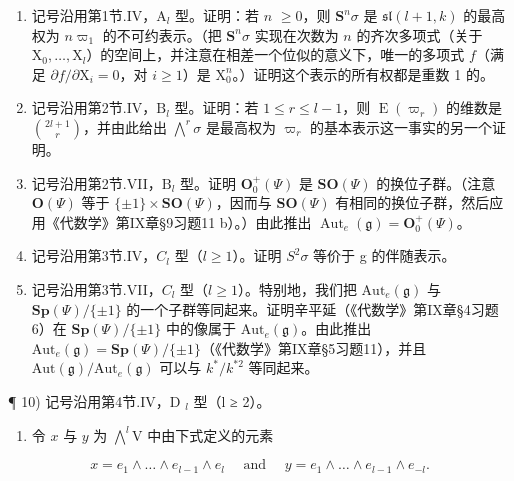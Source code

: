 \begin{enumerate}
\def\labelenumi{\arabic{enumi})}
\setcounter{enumi}{4}
\item
  记号沿用第1节.IV，\(\mathrm{A}_l\) 型。证明：若 \(n\) \(\geq 0\)，则 \(\mathbf{S}^n\sigma\) 是 \(\mathfrak{sl}(l + 1,k)\) 的最高权为 \(n\varpi_1\) 的不可约表示。（把 \(\mathbf{S}^n\sigma\) 实现在次数为 \(n\) 的齐次多项式（关于 \(\mathrm{X}_0,\dots ,\mathrm{X}_l\)）的空间上，并注意在相差一个位似的意义下，唯一的多项式 \(f\)（满足 \(\partial f / \partial \mathrm{X}_i = 0\)，对 \(i\geq 1\)）是 \(\mathrm{X}_0^n\)。）证明这个表示的所有权都是重数 1 的。
\item
  记号沿用第2节.IV，\(\mathrm{B}_l\) 型。证明：若 \(1 \leq r \leq l - 1\)，则 \(\operatorname{E}(\varpi_r)\) 的维数是 \(\binom{2l + 1}{r}\)，并由此给出 \(\bigwedge^r \sigma\) 是最高权为 \(\varpi_r\) 的基本表示这一事实的另一个证明。
\item
  记号沿用第2节.VII，\(\mathrm{B}_l\) 型。证明 \(\mathbf{O}_0^+ (\Psi)\) 是 \(\mathbf{SO}(\Psi)\) 的换位子群。（注意 \(\mathbf{O}(\Psi)\) 等于 \(\{\pm 1\} \times \mathbf{SO}(\Psi)\)，因而与 \(\mathbf{SO}(\Psi)\) 有相同的换位子群，然后应用《代数学》第IX章§9习题11 b）。）由此推出 \(\operatorname{Aut}_e(\mathfrak{g}) = \mathbf{O}_0^+ (\Psi)\)。
\item
  记号沿用第3节.IV，\(C_{l}\) 型（\(l \geq 1\)）。证明 \(S^{2}\sigma\) 等价于 g 的伴随表示。
\item
  记号沿用第3节.VII，\(C_l\) 型（\(l \geq 1\)）。特别地，我们把 \(\mathrm{Aut}_e(\mathfrak{g})\) 与 \(\mathbf{Sp}(\varPsi)/\{\pm 1\}\) 的一个子群等同起来。证明辛平延（《代数学》第IX章§4习题6）在 \(\mathbf{Sp}(\varPsi)/\{\pm 1\}\) 中的像属于 \(\mathrm{Aut}_e(\mathfrak{g})\)。由此推出 \(\mathrm{Aut}_e(\mathfrak{g}) = \mathbf{Sp}(\varPsi)/\{\pm 1\}\)（《代数学》第IX章§5习题11），并且 \(\mathrm{Aut}(\mathfrak{g})/\mathrm{Aut}_e(\mathfrak{g})\) 可以与 \(k^*/k^{*2}\) 等同起来。
\end{enumerate}

¶ 10) 记号沿用第4节.IV，D \(_{l}\) 型（l ≥ 2）。

\begin{enumerate}
\def\labelenumi{\alph{enumi})}
\tightlist
\item
  令 \(x\) 与 \(y\) 为 \(\bigwedge^{l} \mathrm{V}\) 中由下式定义的元素
\end{enumerate}

\[
x = e _ {1} \wedge \dots \wedge e _ {l - 1} \wedge e _ {l} \quad \text { and } \quad y = e _ {1} \wedge \dots \wedge e _ {l - 1} \wedge e _ {- l}.
\]


